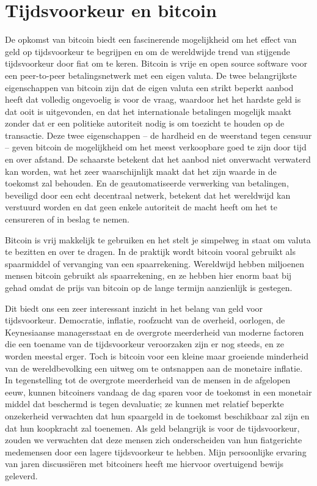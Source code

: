 \documentclass[
  a5paper,
  smalldemyvopaper,11pt,twoside,onecolumn,openright,extrafontsizes,
hidelinks]{memoir}
\begin{document}
\section{Tijdsvoorkeur en bitcoin}\label{tijdsvoorkeur-en-bitcoin}

De opkomst van bitcoin biedt een fascinerende mogelijkheid om het effect
van geld op tijdsvoorkeur te begrijpen en om de wereldwijde trend van
stijgende tijdsvoorkeur door fiat om te keren. Bitcoin is vrije en open
source software voor een peer-to-peer betalingsnetwerk met een eigen
valuta. De twee belangrijkste eigenschappen van bitcoin zijn dat de
eigen valuta een strikt beperkt aanbod heeft dat volledig ongevoelig is
voor de vraag, waardoor het het hardste geld is dat ooit is uitgevonden,
en dat het internationale betalingen mogelijk maakt zonder dat er een
politieke autoriteit nodig is om toezicht te houden op de transactie.
Deze twee eigenschappen -- de hardheid en de weerstand tegen censuur --
geven bitcoin de mogelijkheid om het meest verkoopbare goed te zijn door
tijd en over afstand. De schaarste betekent dat het aanbod niet
onverwacht verwaterd kan worden, wat het zeer waarschijnlijk maakt dat
het zijn waarde in de toekomst zal behouden. En de geautomatiseerde
verwerking van betalingen, beveiligd door een echt decentraal netwerk,
betekent dat het wereldwijd kan verstuurd worden en dat geen enkele
autoriteit de macht heeft om het te censureren of in beslag te nemen.

Bitcoin is vrij makkelijk te gebruiken en het stelt je simpelweg in
staat om valuta te bezitten en over te dragen. In de praktijk wordt
bitcoin vooral gebruikt als spaarmiddel of vervanging van een
spaarrekening. Wereldwijd hebben miljoenen mensen bitcoin gebruikt als
spaarrekening, en ze hebben hier enorm baat bij gehad omdat de prijs van
bitcoin op de lange termijn aanzienlijk is gestegen.

Dit biedt ons een zeer interessant inzicht in het belang van geld voor
tijdsvoorkeur. Democratie, inflatie, roofzucht van de overheid,
oorlogen, de Keynesiaanse managersstaat en de overgrote meerderheid van
moderne factoren die een toename van de tijdsvoorkeur veroorzaken zijn
er nog steeds, en ze worden meestal erger. Toch is bitcoin voor een
kleine maar groeiende minderheid van de wereldbevolking een uitweg om te
ontsnappen aan de monetaire inflatie. In tegenstelling tot de overgrote
meerderheid van de mensen in de afgelopen eeuw, kunnen bitcoiners
vandaag de dag sparen voor de toekomst in een monetair middel dat
beschermd is tegen devaluatie; ze kunnen met relatief beperkte
onzekerheid verwachten dat hun spaargeld in de toekomst beschikbaar zal
zijn en dat hun koopkracht zal toenemen. Als geld belangrijk is voor de
tijdsvoorkeur, zouden we verwachten dat deze mensen zich onderscheiden
van hun fiatgerichte medemensen door een lagere tijdsvoorkeur te hebben.
Mijn persoonlijke ervaring van jaren discussiëren met bitcoiners heeft
me hiervoor overtuigend bewijs geleverd.
\end{document}
